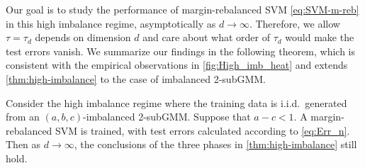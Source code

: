 Our goal is to study the performance of margin-rebalanced SVM \cref{eq:SVM-m-reb} in this high imbalance regime, asymptotically as $d \to \infty$. Therefore, we allow $\tau = \tau_d$ depends on dimension $d$ and care about what order of $\tau_d$ would make the test errors vanish. We summarize our findings in the following theorem, which is consistent with the empirical observations in \cref{fig:High_imb_heat} and extends \cref{thm:high-imbalance} to the case of imbalanced 2-subGMM.

\begin{thm}\label{thm:main_high-imbal}
Consider the high imbalance regime where the training data is i.i.d.~generated from an $(a,b,c)$-imbalanced 2-subGMM. Suppose that $a - c < 1$. A margin-rebalanced SVM is trained, with test errors calculated according to \cref{eq:Err_n}. Then as $d \to \infty$, 
the conclusions of the three phases in \cref{thm:high-imbalance} still hold.
\end{thm}

